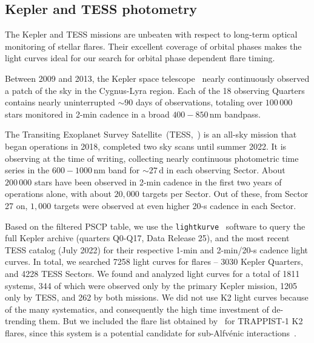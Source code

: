 \documentclass[twocolumn]{aastex631}
\begin{document}
\subsection{Kepler and TESS photometry}
\label{sec:data:photometry}
The Kepler and TESS missions are unbeaten with respect to long-term optical monitoring of stellar flares. Their excellent coverage of orbital phases makes the light curves ideal for our search for orbital phase dependent flare timing.

Between 2009 and 2013, the Kepler space telescope~\citep{koch2010kepler} nearly continuously observed a patch of the sky in the Cygnus-Lyra region. Each of the 18 observing Quarters contains nearly uninterrupted $\sim 90$ days of observations, totaling over $100\,000$ stars monitored in 2-min cadence in a broad $400-850\,$nm bandpass.

The Transiting Exoplanet Survey Satellite~(TESS,~\cite{ricker2015transiting}) is an all-sky mission that began operations in 2018, completed two sky scans until summer 2022. It is observing at the time of writing, collecting nearly continuous photometric time series in the $600-1000\,$nm band for $\sim 27\,$d in each observing Sector. About $200\,000$ stars have been observed in 2-min cadence in the first two years of operations alone, with about $20,000$ targets per Sector. Out of these, from Sector 27 on, $1,000$ targets were observed at even higher 20-s cadence in each Sector. 

Based on the filtered PSCP table, we use the \texttt{lightkurve}~\citep{lightkurvecollaboration2018lightkurve} software to query the full Kepler archive (quarters Q0-Q17, Data Release 25), and the most recent TESS catalog (July 2022) for their respective 1-min and 2-min/20-s cadence light curves. In total, we searched 7258 light curves for flares -- 3030 Kepler Quarters, and 4228 TESS Sectors. We found and analyzed light curves for a total of 1811 systems, 344 of which were observed only by the primary Kepler mission, 1205 only by TESS, and 262 by both missions. We did not use K2 light curves because of the many systematics, and consequently the high time investment of de-trending them. But we included the flare list obtained by~\citet{paudel2018k2} for TRAPPIST-1 K2 flares, since this system is a potential candidate for sub-Alfv\'enic interactions~\citep{fischer2019timevariable}.
\end{document}
